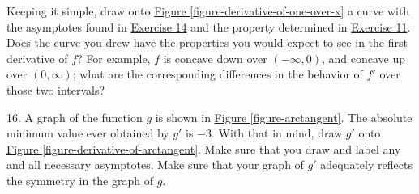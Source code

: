 \documentclass[10pt,oneside,]{book}
\theoremstyle{plain}
\theoremstyle{definition}
\numberwithin{equation}{section}
\newcounter{figstack}
\newcounter{figindex}
\newlength\fight
\newcommand\pushValignCaptionBottom[5][b]{%
\stepcounter{figstack}%
\expandafter\def\csname %
figalign\romannumeral\value{figstack}\endcsname{#1}%
\expandafter\def\csname %
figtype\romannumeral\value{figstack}\endcsname{#2}%
\expandafter\def\csname %
figwd\romannumeral\value{figstack}\endcsname{#3}%
\expandafter\def\csname %
figcontent\romannumeral\value{figstack}\endcsname{#4}%
\expandafter\def\csname %
figcap\romannumeral\value{figstack}\endcsname{#5}%
\setbox0=\hbox{%
\begin{#2}{#3}#4\end{#2}}%
\ifdim\dimexpr\ht0+\dp0\relax>\fight\global\setlength{\fight}{%
\dimexpr\ht0+\dp0\relax}\fi%
}
\newcommand\popValignCaptionBottom{%
\setcounter{figindex}{0}%
\hfill%
\whiledo{\value{figindex}<\value{figstack}}{%
\stepcounter{figindex}%
\def\tmp{\csname figwd\romannumeral\value{figindex}\endcsname}%
\begin{\csname figtype\romannumeral\value{figindex}\endcsname}[t]{\tmp}%
\centering%
\stackinset{c}{}%
{\csname figalign\romannumeral\value{figindex}\endcsname}{}%
{\csname figcontent\romannumeral\value{figindex}\endcsname}%
{\rule{0pt}{\fight}}\par%
\csname figcap\romannumeral\value{figindex}\endcsname%
\end{\csname figtype\romannumeral\value{figindex}\endcsname}%
\hfill%
}%
\setcounter{figstack}{0}%
\setlength{\fight}{0pt}%
\hfill%
}
\newcommand{\fe}[2]{#1\mathopen{}\left(#2\right)\mathclose{}}
\newcommand{\ointerval}[2]{\left(#1,#2\right)}
\newcommand{\fd}[1]{#1'}
\begin{document}
\begin{exerciselist}
\begin{exercisegroup}
\exercise[15.]\hypertarget{exercise-243}{\null}Keeping it simple, draw onto \hyperref[figure-derivative-of-one-over-x]{Figure \ref{figure-derivative-of-one-over-x}} a curve with the asymptotes found in \hyperlink{exercise-asymptotes-one-over-x}{Exercise 14} and the property determined in \hyperlink{exercise-negative-derivative-of-one-over-x}{Exercise 11}. Does the curve you drew have the properties you would expect to see in the first derivative of \(f\)? For example, \(f\) is concave down over \(\ointerval{-\infty}{0}\), and concave up over \(\ointerval{0}{\infty}\); what are the corresponding differences in the behavior of \(\fd{f}\) over those two intervals?%
\end{exercisegroup}
\par\smallskip\noindent
\item[16.]\hypertarget{exercise-244}{\null}A graph of the function \(g\) is shown in \hyperref[figure-arctangent]{Figure \ref{figure-arctangent}}. The absolute minimum value ever obtained by \(\fd{g}\) is \(-3\). With that in mind, draw \(\fd{g}\) onto \hyperref[figure-derivative-of-arctangent]{Figure \ref{figure-derivative-of-arctangent}}. Make sure that you draw and label any and all necessary asymptotes. Make sure that your graph of \(\fd{g}\) adequately reflects the symmetry in the graph of \(g\).%
\par\smallskip
\end{exerciselist}
\end{document}
